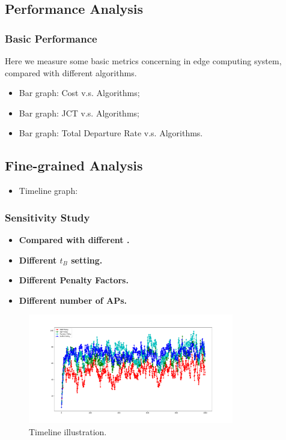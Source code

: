 \subsection{Performance Analysis}
    \subsubsection{Basic Performance}
    Here we measure some basic metrics concerning in edge computing system, compared with different algorithms.
    \begin{itemize}
        \item Bar graph: Cost v.s. Algorithms;
        \item Bar graph: JCT v.s. Algorithms;
        \item Bar graph: Total Departure Rate v.s. Algorithms. 
    \end{itemize}

    \subsection{Fine-grained Analysis}
    \begin{itemize}
        \item Timeline graph: 
    \end{itemize}

    \subsubsection{Sensitivity Study}
    \begin{itemize}
        \item \textbf{Compared with different \brlatency.}
        \item \textbf{Different $t_B$ setting.}
        \item \textbf{Different Penalty Factors.}
        \item \textbf{Different number of APs.}
    \end{itemize}

\begin{figure}[htp!]
    \centering
    \includegraphics[width=0.80\textwidth]{images/Figure_1.pdf}
    \caption{Timeline illustration.}
    \label{fig:general_timeline}
\end{figure}

